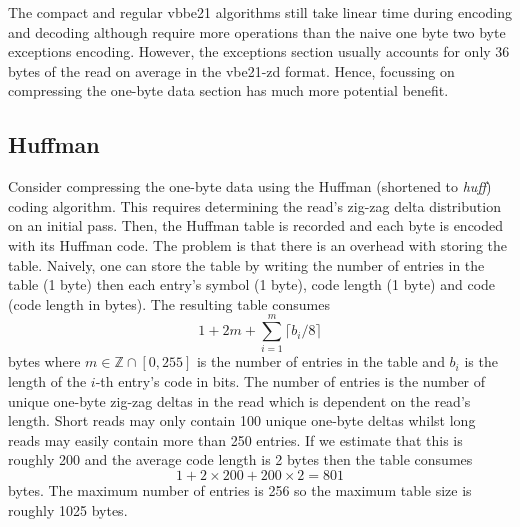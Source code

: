



The compact and regular vbbe21 algorithms still take linear time during encoding
and decoding although require more operations than the naive one byte two byte
exceptions encoding. However, the exceptions section usually accounts for only
36 bytes of the read on average in the vbe21-zd format. Hence, focussing on
compressing the one-byte data section has much more potential benefit.


\subsection{Huffman}

Consider compressing the one-byte data using the Huffman (shortened to
\textit{huff}) coding algorithm. This requires determining the read's zig-zag
delta distribution on an initial pass. Then, the Huffman table is recorded and
each byte is encoded with its Huffman code. The problem is that there is an
overhead with storing the table.  Naively, one can store the table by writing
the number of entries in the table (1 byte) then each entry's symbol (1 byte),
code length (1 byte) and code (code length in bytes). The resulting table
consumes
\[ 1 + 2m + \sum_{i=1}^m\lceil b_i / 8 \rceil \]
bytes where $m\in\mathbb{Z}\cap[0,255]$ is the number of entries in the table
and $b_i$ is the length of the $i$-th entry's code in bits. The number of
entries is the number of unique one-byte zig-zag deltas in the read which is
dependent on the read's length. Short reads may only contain 100 unique one-byte
deltas whilst long reads may easily contain more than 250 entries. If we
estimate that this is roughly 200 and the average code length is 2 bytes then
the table consumes
\[ 1 + 2\times 200 + 200\times 2 = 801 \]
bytes. The maximum number of entries is 256 so the maximum table size is roughly
1025 bytes.

